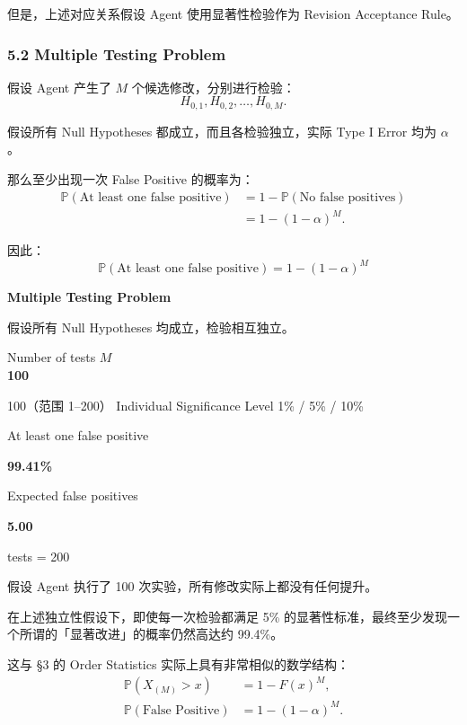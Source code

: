 但是，上述对应关系假设 Agent 使用显著性检验作为 Revision Acceptance Rule。

\hypertarget{part-2-16-0001-multiple-testing-problem}{%
\subsubsection{5.2 Multiple Testing Problem}\label{part-2-16-0001-multiple-testing-problem}}

假设 Agent 产生了 \(M\) 个候选修改，分别进行检验：
\[H_{0,1},H_{0,2},\ldots,H_{0,M}.\]

假设所有 Null Hypotheses 都成立，而且各检验独立，实际 Type I Error 均为 \(\alpha\)。

那么至少出现一次 False Positive 的概率为：
\[\begin{aligned}
\mathbb P(\text{At least one false positive})
&=1-\mathbb P(\text{No false positives})\\
&=1-(1-\alpha)^M.
\end{aligned}\]

因此：
\[\boxed{
\mathbb P(\text{At least one false positive})
=
1-(1-\alpha)^M
}\]

\textbf{Multiple Testing Problem}

假设所有 Null Hypotheses 均成立，检验相互独立。

Number of tests \(M\)\\
\textbf{100}

100（范围 1--200） Individual Significance Level 1\% / 5\% / 10\%

At least one false positive

\textbf{99.41\%}

Expected false positives

\textbf{5.00}


tests = 200


假设 Agent 执行了 100 次实验，所有修改实际上都没有任何提升。

在上述独立性假设下，即使每一次检验都满足 5\% 的显著性标准，最终至少发现一个所谓的「显著改进」的概率仍然高达约 99.4\%。

这与 §3 的 Order Statistics 实际上具有非常相似的数学结构：
\[\begin{aligned}
\mathbb P(X_{(M)}>x)&=1-F(x)^M,\\
\mathbb P(\text{False Positive})&=1-(1-\alpha)^M.
\end{aligned}\]


